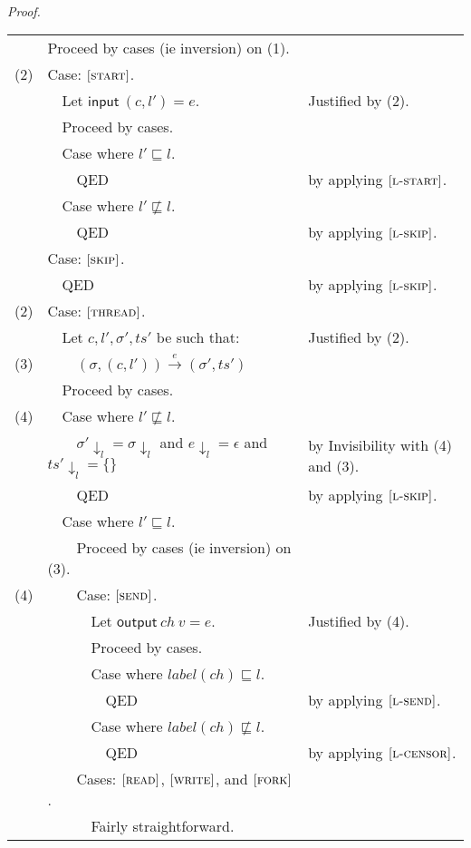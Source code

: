 \documentclass{article}
\newcommand{\rn}[1]{\text{\textsc{[#1]}}}
\newcommand{\tsteparrow}[1]{\overset{#1}{\longrightarrow}}
\newcommand{\tstep}[3]{#2\tsteparrow{#1}#3}
\newcommand{\thread}[2]{(#1,#2)}
\newcommand{\evstart}[1]{\textsf{input}~#1}
\newcommand{\evsend}[2]{\textsf{output}~#1~#2}
\newcommand{\proj}[2]{#1{\downarrow_{#2}}}
\begin{document}
\\
\textit{Proof.}
\\
\newcommand{\z}{$\quad$}
\begin{tabular}{l@{$\qquad$}l@{\qquad}l}
        & Proceed by cases (ie inversion) on (1).
\\
  (2)   & Case: $\rn{start}$.
\\
        & \z Let $\evstart{\thread{c}{l'}}=e$.
        & Justified by (2).
\\
        & \z Proceed by cases.
\\
        & \z Case where $l'\sqsubseteq l$.
\\
        & \z \z QED
        & by applying $\rn{l-start}$.
\\
        & \z Case where $l'\not\sqsubseteq l$.
\\
        & \z \z QED
        & by applying $\rn{l-skip}$.
\\
        & Case: $\rn{skip}$.
\\
        & \z QED
        & by applying $\rn{l-skip}$.
\\
  (2)   & Case: $\rn{thread}$.
\\
        & \z Let $c,l',\sigma',ts'$ be such that:
        & Justified by (2).
\\
  (3)   & \z \z $\tstep{e}{(\sigma,\thread{c}{l'})}{(\sigma',ts')}$
\\
        & \z Proceed by cases.
\\
  (4)   & \z Case where $l'\not\sqsubseteq l$.
\\
        & \z \z $\proj{\sigma'}{l}=\proj{\sigma}{l}$ and $\proj{e}{l}=\epsilon$ and $\proj{ts'}{l}=\{\}$
        & by Invisibility with (4) and (3).
\\
        & \z \z QED
        & by applying $\rn{l-skip}$.
\\
        & \z Case where $l'\sqsubseteq l$.
\\
        & \z \z Proceed by cases (ie inversion) on (3).
\\
  (4)   & \z \z Case: $\rn{send}$.
\\
        & \z \z \z Let $\evsend{ch}{v} = e$.
        & Justified by (4).
\\
        & \z \z \z Proceed by cases.
\\
        & \z \z \z Case where $label(ch)\sqsubseteq l$.
\\
        & \z \z \z \z QED
        & by applying $\rn{l-send}$.
\\
        & \z \z \z Case where $label(ch)\not\sqsubseteq l$.
\\
        & \z \z \z \z QED
        & by applying $\rn{l-censor}$.
\\
        & \z \z Cases: $\rn{read}$, $\rn{write}$, and $\rn{fork}$.
\\
        & \z \z \z Fairly straightforward.
\end{tabular}
\end{document}

